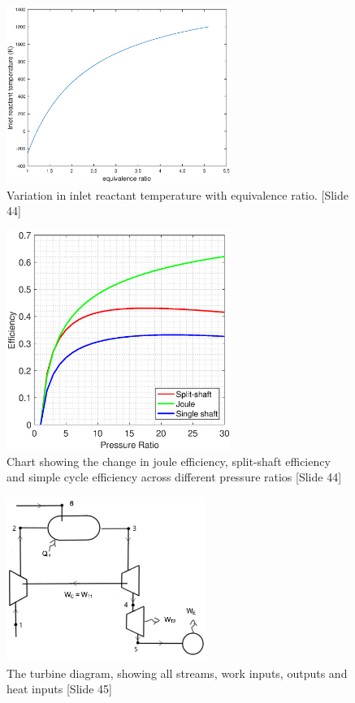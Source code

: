 \begin{figure} [h]
\centering
\includegraphics[width=0.65\textwidth]{./pictures/combustor.eps}
  \caption{Variation in inlet reactant temperature with equivalence ratio. [Slide 44]} \label{fig:flametemp}
  \end{figure} 
\begin{figure} [H]
\centering
\includegraphics[width=0.65\textwidth]{./pictures/efficiencyPT.eps}
  \caption{Chart showing the change in joule efficiency, split-shaft efficiency and simple cycle efficiency across different pressure ratios [Slide 44]} \label{fig:twinefficiency}
  \end{figure}
  
\begin{figure} [H]
\centering
\includegraphics[width=0.58\textwidth]{./pictures/plantdiagram.png}
  \caption{The turbine diagram, showing all streams, work inputs, outputs and heat inputs [Slide 45]} \label{fig:turbinediagram}
  \end{figure}
  
